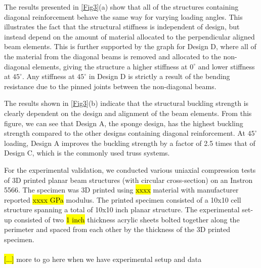 \documentclass[9pt,twocolumn,twoside]{fernandes_paper}
\newcommand{\mf}[1]{\colorbox{blue!10}{\color{color3}#1}}
\begin{document}
The results presented in \cref{Fig3}(a) show that all of the structures containing diagonal reinforcement behave the same way for varying loading angles. This illustrates the fact that the structural stiffness is independent of design, but instead depend on the amount of material allocated to the perpendicular aligned beam elements. This is further supported by the graph for Design D, where all of the material from the diagonal beams is removed and allocated to the non-diagonal elements, giving the structure a higher stiffness at $0^\circ$ and lower stiffness at $45^\circ$. Any stiffness at $45^\circ$ in Design D is strictly a result of the bending resistance due to the pinned joints between the non-diagonal beams.

The results shown in \cref{Fig3}(b) indicate that the structural buckling strength is clearly dependent on the design and alignment of the beam elements. From this figure, we can see that Design A, the sponge design, has the highest buckling strength compared to the other designs containing diagonal reinforcement. At $45^\circ$ loading, Design A improves the buckling strength by a factor of 2.5 times that of Design C, which is the commonly used truss systems. 

For the experimental validation, we conducted various uniaxial compression tests of 3D printed planar beam structures (with circular cross-section) on an Instron 5566. The specimen was 3D printed using \hl{xxxx} material with manufacturer reported \hl{xxxx GPa} modulus. The printed specimen consisted of a 10x10 cell structure spanning a total of 10x10 inch planar structure. The experimental set-up consisted of two \hl{1 inch} thickness acrylic sheets bolted together along the perimeter and spaced from each other by the thickness of the 3D printed specimen.\\\\\hl{[...]} \mf{more to go here when we have experimental setup and data}


\end{document}
